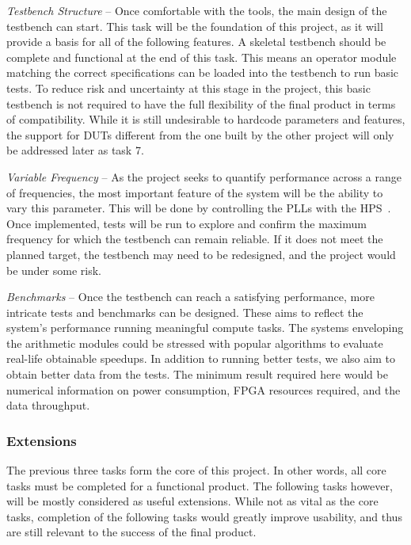 \textit{Testbench Structure} --
Once comfortable with the tools, the main design of the testbench can start.
This task will be the foundation of this project, as it will provide a basis
for all of the following features.
A skeletal testbench should be complete and functional at the end of this
task.
This means an operator module matching the correct specifications can
be loaded into the testbench to run basic tests.
To reduce risk and uncertainty at this stage in the project, this basic
testbench is not required to have the full flexibility of the final product
in terms of compatibility.
While it is still undesirable to hardcode parameters and features,
the support for DUTs different from the one built by the other project will
only be addressed later as task 7.

\textit{Variable Frequency} --
As the project seeks to quantify performance across a range of frequencies,
the most important feature of the system will be the ability to vary this
parameter.
This will be done by controlling the PLLs with the HPS~\cite{Altera4}.
Once implemented, tests will be run to explore and confirm the maximum
frequency for which the testbench can remain reliable.
If it does not meet the planned target, the testbench may need to be redesigned,
and the project would be under some risk.


\textit{Benchmarks} --
Once the testbench can reach a satisfying performance, more intricate tests and
benchmarks can be designed.
These aims to reflect the system's performance running meaningful compute
tasks.
The systems enveloping the arithmetic modules could be stressed with popular
algorithms to evaluate real-life obtainable speedups.
In addition to running better tests, we also aim to obtain better data from
the tests.
The minimum result required here would be numerical information on power
consumption, FPGA resources required, and the data throughput.

\subsubsection{Extensions}

The previous three tasks form the core of this project.
In other words, all core tasks must be completed for a functional product.
The following tasks however, will be mostly considered as useful extensions.
While not as vital as the core tasks, completion of the following tasks would
greatly improve usability, and thus are still relevant to the success
of the final product.

